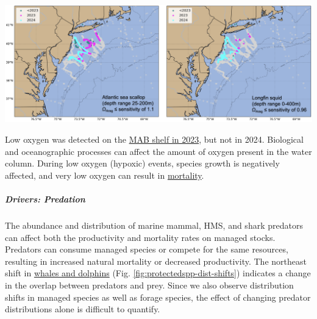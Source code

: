\documentclass[
  10pt,
]{article}
\let\origfigure\figure
\let\endorigfigure\endfigure
\renewenvironment{figure}[1][2] {
    \expandafter\origfigure\expandafter[H]
} {
    \endorigfigure
}
\begin{document}
\begin{figure}

{\centering \includegraphics[width=1\linewidth]{images/BothReports/SOE-2025-OA-figure_final_GraceSaba_2025} 

}

\caption{Locations where bottom aragonite saturation state ($\Omega_{Arag}$; summer only: June-August) were at or below the laboratory-derived sensitivity level for Atlantic sea scallop (left panel) and longfin squid (right panel) for the time periods 2007-2022 (dark cyan), 2023 only (magenta) and 2024 only (cyan). Gray circles indicate locations where bottom $\Omega_{Arag}$ values were above the species specific sensitivity values..}\label{fig:mab-oa}
\end{figure}

Low oxygen was detected on the \href{https://noaa-edab.github.io/catalog/observation_synthesis_2023.html}{MAB shelf in 2023}, but not in 2024. Biological and oceanographic processes can affect the amount of oxygen present in the water column. During low oxygen (hypoxic) events, species growth is negatively affected, and very low oxygen can result in \href{https://sebsnjaesnews.rutgers.edu/2023/12/rutgers-scientists-observe-unusual-ocean-conditions-possibly-linked-to-mortality-in-marine-life-off-new-jersey/}{mortality}.

\subparagraph{Drivers: Predation}\label{drivers-predation}

The abundance and distribution of marine mammal, HMS, and shark predators can affect both the productivity and mortality rates on managed stocks. Predators can consume managed species or compete for the same resources, resulting in increased natural mortality or decreased productivity. The northeast shift in \href{https://noaa-edab.github.io/catalog/cetacean_dist.html}{whales and dolphins} (Fig. \ref{fig:protectedspp-dist-shifts}) indicates a change in the overlap between predators and prey. Since we also observe distribution shifts in managed species as well as forage species, the effect of changing predator distributions alone is difficult to quantify.
\end{document}
